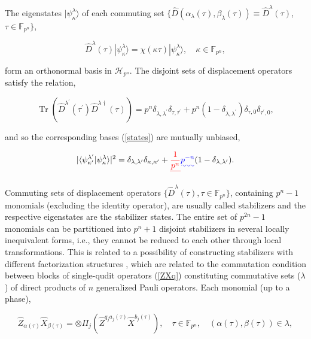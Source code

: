 \documentclass[quantumrep,article,submit,pdftex,moreauthors]{Definitions/mdpi}
\DeclareMathOperator{\Tr}{Tr}
\providecommand{\DIFadd}[1]{{\protect\color{blue}\uwave{#1}}} %
\providecommand{\DIFdel}[1]{{\protect\color{red}\sout{#1}}}                      %
\providecommand{\DIFaddbegin}{} %
\providecommand{\DIFaddend}{} %
\providecommand{\DIFdelbegin}{} %
\providecommand{\DIFdelend}{} %
\begin{document}
The eigenstates $|\psi_\kappa^\lambda\rangle$ of each commuting set
$\{\hat{D}\left(\alpha_{\lambda}(\tau),\beta_{\lambda}(\tau)\right) \equiv
\hat{D}^{\lambda}(\tau)$, $\tau \in \mathbb{F}_{p^{n}}\}$,

\begin{equation}
  \hat{D}^{\lambda}(\tau)|\psi_{\kappa}^{\lambda}\rangle
  = \chi(\kappa \tau) |\psi_{\kappa}^{\lambda}\rangle,
  \quad \kappa \in \mathbb{F}_{p^{n}},
  \label{states}
\end{equation}

form an orthonormal basis in $\mathcal{H}_{p^{n}}$. The disjoint sets of
displacement operators satisfy the relation,

\begin{equation*}
  \Tr\left(
    \hat{D}^{\lambda^{\prime}}(\tau^{\prime})\hat{D}^{\lambda\dagger}(\tau)
  \right)
  = p^{n} \delta_{\lambda,\lambda^{\prime}} \delta_{\tau,\tau^{\prime}}
  + p^{n}(1-\delta_{\lambda,\lambda^{\prime}}) \delta_{\tau,0}
  \delta_{\tau^{\prime},0},
\end{equation*}

and so the corresponding bases (\ref{states}) are mutually unbiased,

\begin{equation}
  |\langle\psi_{\kappa^{\prime}}^{\lambda^{\prime}}
  |\psi_{\kappa}^{\lambda}\rangle|^{2}
  = \delta_{\lambda,\lambda^{\prime}} \delta_{\kappa,\kappa^{\prime}}
  + \DIFdelbegin \DIFdel{\frac{1}{p^{n}} }\DIFdelend \DIFaddbegin \DIFadd{p^{-n} }\DIFaddend (1-\delta_{\lambda,\lambda^{\prime}}).
  \label{UB}
\end{equation}

Commuting sets of displacement operators $\{\hat{D}^{\lambda }(\tau), \tau \in
\mathbb{F}_{p^{n}}\}$, containing $p^{n}-1$ monomials (excluding the identity
operator), are usually called stabilizers and the respective eigenstates are
the
 stabilizer states. The entire set of $p^{2n}-1$ monomials can be
partitioned
 into $p^{n}+1$ disjoint stabilizers in several locally
inequivalent forms, i.e.,
 they cannot be reduced to each other through local
transformations. This is
 related to a possibility of constructing stabilizers
with different
 factorization structures \cite{factor1,factor2}, which are
related to the
 commutation condition between blocks of single-qudit operators
(\ref{ZXq})
 constituting commutative sets ($\lambda$) of direct products of
$n$
 generalized Pauli operators. Each monomial (up to a phase),

\begin{equation*}
  \hat{Z}_{\alpha(\tau)}\hat{X}_{\beta(\tau)}
  = \otimes \Pi_{j} \left(
    \hat{Z}^{q_{j}a_{j}(\tau)}\hat{X}^{b_{j}(\tau)}
  \right),
  \quad \tau \in \mathbb{F}_{p^{n}},
  \quad \left(\alpha(\tau),\beta(\tau)\right) \in \lambda,
\end{equation*}
\end{document}
